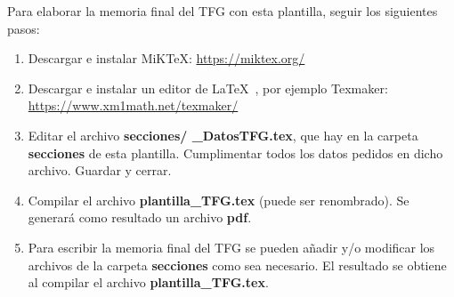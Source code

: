 \vspace*{1.5cm}
Para elaborar la memoria final del TFG con esta plantilla, seguir los siguientes pasos:
\begin{enumerate}
\item Descargar e instalar MiKTeX:  \url{https://miktex.org/}
\item Descargar e instalar un editor de \LaTeX~, por ejemplo Texmaker:\\
\url{https://www.xm1math.net/texmaker/}

\item Editar el archivo \textbf{secciones/ \_DatosTFG.tex}, que hay en la carpeta \textbf{secciones} de esta plantilla. Cumplimentar todos los datos pedidos en dicho archivo. Guardar y cerrar.
\item Compilar el archivo \textbf{plantilla\_TFG.tex} (puede ser renombrado). Se generará como resultado un archivo \textbf{pdf}.
\item Para escribir la memoria final del TFG se pueden añadir y/o modificar los archivos de la carpeta \textbf{secciones} como sea necesario. El resultado se obtiene al compilar el archivo \textbf{plantilla\_TFG.tex}. 
\end{enumerate}

